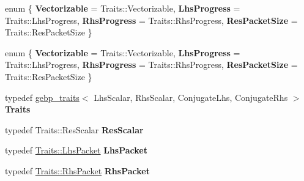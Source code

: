 \begin{DoxyCompactItemize}
\item 
\mbox{\label{struct_eigen_1_1internal_1_1gebp__kernel_a04c3d578ded49948388120afb87e41a7}} 
enum \{ {\bfseries Vectorizable} = Traits\+:\+:Vectorizable, 
{\bfseries Lhs\+Progress} = Traits\+:\+:Lhs\+Progress, 
{\bfseries Rhs\+Progress} = Traits\+:\+:Rhs\+Progress, 
{\bfseries Res\+Packet\+Size} = Traits\+:\+:Res\+Packet\+Size
 \}
\item 
\mbox{\label{struct_eigen_1_1internal_1_1gebp__kernel_a8c482854485fe03aa598657f8deb3e88}} 
enum \{ {\bfseries Vectorizable} = Traits\+:\+:Vectorizable, 
{\bfseries Lhs\+Progress} = Traits\+:\+:Lhs\+Progress, 
{\bfseries Rhs\+Progress} = Traits\+:\+:Rhs\+Progress, 
{\bfseries Res\+Packet\+Size} = Traits\+:\+:Res\+Packet\+Size
 \}
\item 
\mbox{\label{struct_eigen_1_1internal_1_1gebp__kernel_a6a9cda2b9874531c270a04e6832d31ff}} 
typedef \hyperlink{class_eigen_1_1internal_1_1gebp__traits}{gebp\+\_\+traits}$<$ Lhs\+Scalar, Rhs\+Scalar, Conjugate\+Lhs, Conjugate\+Rhs $>$ {\bfseries Traits}
\item 
\mbox{\label{struct_eigen_1_1internal_1_1gebp__kernel_abcd48a522e4a7a6a8a1e4445d384ae34}} 
typedef Traits\+::\+Res\+Scalar {\bfseries Res\+Scalar}
\item 
\mbox{\label{struct_eigen_1_1internal_1_1gebp__kernel_ab582b2aa13b4850eb1d2e21ffa6f5a4f}} 
typedef \hyperlink{class_eigen_1_1internal_1_1_tensor_lazy_evaluator_writable}{Traits\+::\+Lhs\+Packet} {\bfseries Lhs\+Packet}
\item 
\mbox{\label{struct_eigen_1_1internal_1_1gebp__kernel_a0173951a3e20a8831bc72928cdeadfdb}} 
typedef \hyperlink{class_eigen_1_1internal_1_1_tensor_lazy_evaluator_writable}{Traits\+::\+Rhs\+Packet} {\bfseries Rhs\+Packet}
\item 
\mbox{\label{struct_eigen_1_1internal_1_1gebp__kernel_accee30d2e60594819d6aec8194ddfa73}} 

\end{DoxyCompactItemize}
